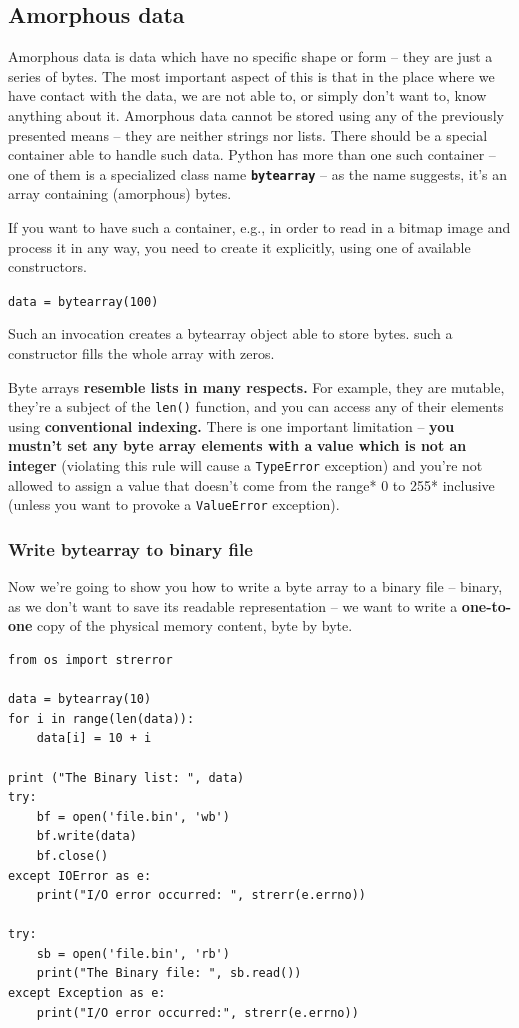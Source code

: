 \documentclass[11pt]{article}
\begin{document}
\subsection{Amorphous data}
\label{sec:org894006d}
Amorphous data is data which have no specific shape or form – they are
just a series of bytes. The most important aspect of this is that in
the place where we have contact with the data, we are not able to, or
simply don’t want to, know anything about it. Amorphous data cannot be
stored using any of the previously presented means – they are neither
strings nor lists. There should be a special container able to handle
such data. Python has more than one such container – one of them is a
specialized class name \textbf{\texttt{bytearray}} – as the name suggests, it’s an array
containing (amorphous) bytes.

If you want to have such a container, e.g., in order to read in a
bitmap image and process it in any way, you need to create it
explicitly, using one of available constructors.

\texttt{data = bytearray(100)}

Such an invocation creates a bytearray object able to store
bytes. such a constructor fills the whole array with zeros.

Byte arrays \textbf{resemble lists in many respects.} For example, they are
mutable, they’re a subject of the \texttt{len()} function, and you can access
any of their elements using \textbf{conventional indexing.} There is one
important limitation – \textbf{you mustn’t set any byte array elements with a}
\textbf{value which is not an integer} (violating this rule will cause a
\texttt{TypeError} exception) and you’re not allowed to assign a value that
doesn’t come from the range* 0 to 255* inclusive (unless you want to
provoke a \texttt{ValueError} exception).

\subsubsection{Write bytearray to binary file}
\label{sec:org59f9ec5}
Now we’re going to show you how to write a byte array to a binary file
– binary, as we don’t want to save its readable representation – we
want to write a \textbf{one-to-one} copy of the physical memory content, byte
by byte.

\begin{verbatim}
from os import strerror

data = bytearray(10)
for i in range(len(data)):
	data[i] = 10 + i

print ("The Binary list: ", data)
try:
	bf = open('file.bin', 'wb')
	bf.write(data)
	bf.close()
except IOError as e:
	print("I/O error occurred: ", strerr(e.errno))

try:
	sb = open('file.bin', 'rb')
	print("The Binary file: ", sb.read())
except Exception as e:
	print("I/O error occurred:", strerr(e.errno))
\end{verbatim}
\end{document}
